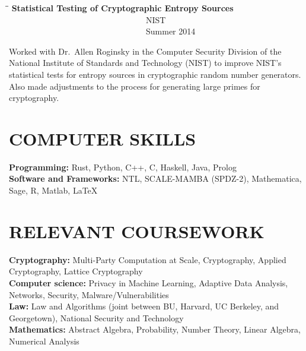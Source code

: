 \documentclass{res}
\begin{document}
\begin{resume}
	\begin{tabbing}
	\hspace{3in}\=  \hspace{1.63in}\= \kill %
	{\bf Statistical Testing of Cryptographic Entropy Sources} \>~~~~~~~~~~~~~~~~~~~~~~~~~~~~~~~~~NIST 
 \>~~~~~~~~~~~~~~~~~~~~~~~~~~~~~~~~~Summer 2014\\      
	\end{tabbing} \vspace{-30pt}
	Worked with Dr.~Allen Roginsky in the Computer Security Division of the National Institute of Standards and Technology (NIST) to improve NIST's statistical tests for entropy sources in cryptographic random number generators.  Also made adjustments to the process for generating large primes for cryptography.
\\



\section{COMPUTER SKILLS}  
\vspace{0.1in}

\textbf{Programming:} Rust, Python, C++, C, Haskell, Java, Prolog\\         
\textbf{Software and Frameworks:} NTL, SCALE-MAMBA (SPDZ-2), Mathematica, Sage, R, Matlab, \LaTeX \\



\section{RELEVANT COURSEWORK}   
\vspace{0.1in}

    \textbf{Cryptography:} Multi-Party Computation at Scale, Cryptography,
    Applied Cryptography, Lattice Cryptography \\
    \textbf{Computer science:} Privacy in Machine Learning, Adaptive Data Analysis, 
    Networks, Security, Malware/Vulnerabilities \\   
    \textbf{Law:} Law and Algorithms (joint between BU, Harvard, UC Berkeley, and Georgetown), National Security and Technology \\
    \textbf{Mathematics:} Abstract Algebra, Probability, Number Theory, Linear Algebra,
    Numerical Analysis  \\




\end{resume}
\end{document}
